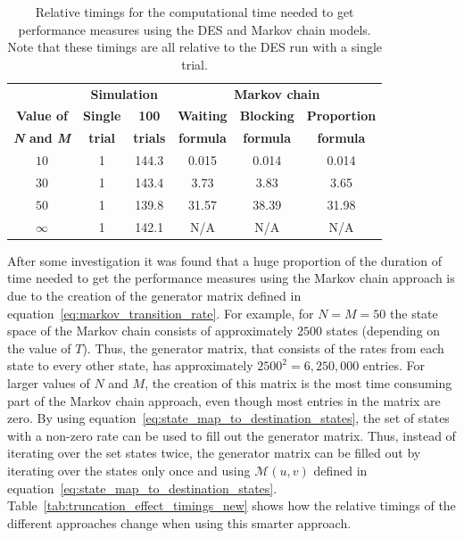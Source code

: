 \tiny
\begin{table}[H]
    \centering
    \caption{Relative timings for the computational time needed to get
    performance measures using the DES and Markov chain models. Note that these
    timings are all relative to the DES run with a single trial.}
    \begin{tabular}{c|cc|ccc}
        & \multicolumn{2}{c}{\textbf{Simulation}} &
        \multicolumn{3}{c}{\textbf{Markov chain}} \\
        \textbf{Value of} & \textbf{Single} & \textbf{100} &
        \textbf{Waiting} & \textbf{Blocking} &
        \textbf{Proportion} \\
        \textbf{\textit{N} and \textit{M}} & \textbf{trial} & \textbf{trials} &
        \textbf{formula} & \textbf{formula} & \textbf{formula} \\
        \hline
        \(10\) & 1 & 144.3 & 0.015  & 0.014  & 0.014 \\
        \hline
        \(30\) & 1 & 143.4 & 3.73   & 3.83   & 3.65 \\
        \hline
        \(50\) & 1 & 139.8 & 31.57  & 38.39  & 31.98 \\
        \hline
        \(\infty\) & 1 & 142.1 & N/A & N/A & N/A \\
    \end{tabular}
    \label{tab:truncation_effect_timings_old}
\end{table}
\normalsize

After some investigation it was found that a huge proportion of the duration of
time needed to get the performance measures using the Markov chain approach is
due to the creation of the generator matrix defined in
equation~\eqref{eq:markov_transition_rate}.
For example, for \(N = M = 50\) the state space of the Markov chain consists
of approximately \(2500\) states (depending on the value of \(T\)).
Thus, the generator matrix, that consists of the rates from each state to every
other state, has approximately \(2500^2 = 6,\!250,\!000\) entries.
For larger values of \(N\) and \(M\), the creation of this matrix is the most
time consuming part of the Markov chain approach, even though most entries in
the matrix are zero.
By using equation~\eqref{eq:state_map_to_destination_states}, the set of states
with a non-zero rate can be used to fill out the generator matrix.
Thus, instead of iterating over the set states twice, the generator matrix can
be filled out by iterating over the states only once and using
\(\mathcal{M}(u,v)\) defined in
equation~\eqref{eq:state_map_to_destination_states}.
Table~\ref{tab:truncation_effect_timings_new} shows how the relative timings
of the different approaches change when using this smarter approach.


